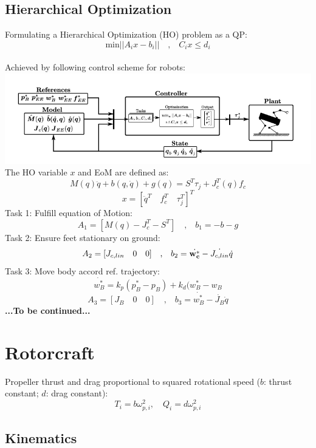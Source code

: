 \documentclass[a4paper, 8pt]{extarticle}
\begin{document}
\begin{multicols*}{3}
\subsection{Hierarchical Optimization}
Formulating a Hierarchical Optimization (HO) problem as a QP:
$$ \textrm{min}||A_{i}x-b_{i}||\quad \textrm{,} \quad C_{i}x\leq d_{i}$$\\
Achieved by following control scheme for robots:
\includegraphics[width=1.05\linewidth]{images/Control_Legged.PNG}\\
The HO variable $x$ and EoM are defined as:
$$ M(q)\ddot{q}+b(q,\dot{q})+g(q)=S^{T}\tau_{j}+J_{c}^T(q)f_{c}$$
$$x= [\ddot{q}^T \quad f_{c}^T \quad \tau_{j}^T ]^T$$
Task 1: Fulfill equation of Motion:
$$ A_{1}=[M(q) -J_{c}^T -S^T] \quad \textrm{,} \quad b_{1}=-b-g$$
Task 2: Ensure feet stationary on ground:
$$ A_{2}=[J_{c,lin} \quad 0 \quad 0] \quad \textrm{,} \quad b_{2}=\dot{\bf w_{c}^*}-\dot{J_{c,lin}}\dot{q}$$
Task 3: Move body accord ref. trajectory:
$$ \dot{ w_{B}^*}=k_{p}(p_{B}^*-p_{B})+k_{d}(w_{B}^*-w_{B} $$
$$ A_{3}=[J_{B} \quad 0 \quad 0] \quad \textrm{,} \quad b_{3}=\dot{w_{B}^*}-\dot{J_{B}}\dot{q} $$
\textbf{...To be continued...}
\section{Rotorcraft}

Propeller thrust and drag proportional to squared rotational speed ($b$: thrust constant; $d$: drag constant):
$$T_i = b\omega_{p,i}^2, \quad Q_i = d\omega_{p,i}^2$$


\subsection{Kinematics}


\end{multicols*}
\end{document}
